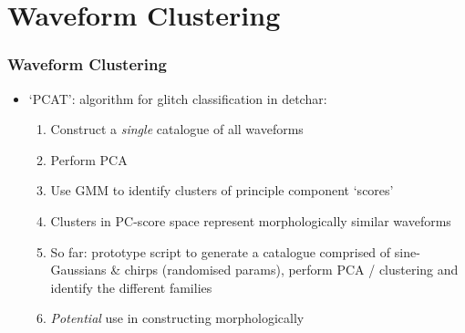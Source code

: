 \documentclass{beamer}
\begin{document}
\section{Waveform Clustering}

\begin{frame}
    \frametitle{Waveform Clustering}
    \begin{itemize}
        \item `PCAT': algorithm for glitch classification in detchar:
            \begin{enumerate}
                \item Construct a \emph{single} catalogue of all waveforms
                \item Perform PCA
                \item Use GMM to identify clusters of principle component
                    `scores'
                \item Clusters in PC-score space represent morphologically
                    similar waveforms
                \item So far: prototype script to generate a catalogue
                    comprised of sine-Gaussians \& chirps (randomised params),
                    perform PCA / clustering and identify the different families
                \item \emph{Potential} use in constructing morphologically 
            \end{enumerate}
    \end{itemize}
\end{frame}
\end{document}
